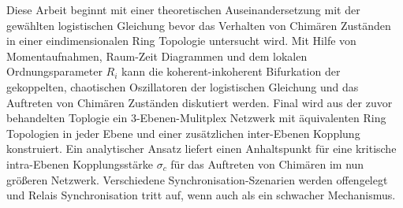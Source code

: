 Diese Arbeit beginnt mit einer theoretischen Auseinandersetzung mit der gewählten logistischen Gleichung bevor das Verhalten von Chimären Zuständen in einer eindimensionalen Ring Topologie untersucht wird. Mit Hilfe von Momentaufnahmen, Raum-Zeit Diagrammen und dem lokalen Ordnungsparameter $R_i$ kann die koherent-inkoherent Bifurkation der gekoppelten, chaotischen Oszillatoren der logistischen Gleichung und das Auftreten von Chimären Zuständen diskutiert werden. Final wird aus der zuvor behandelten Toplogie ein 3-Ebenen-Mulitplex Netzwerk mit äquivalenten Ring Topologien in jeder Ebene und einer zusätzlichen inter-Ebenen Kopplung konstruiert. Ein analytischer Ansatz liefert einen Anhaltspunkt für eine kritische intra-Ebenen Kopplungsstärke $\sigma_c$ für das Auftreten von Chimären im nun größeren Netzwerk. Verschiedene Synchronisation-Szenarien werden offengelegt und Relais Synchronisation tritt auf, wenn auch als ein schwacher Mechanismus.

\newpage\leavevmode\thispagestyle{empty}\newpage

\setcounter{tocdepth}{2}

{\small\tableofcontents}
\thispagestyle{empty}

\newpage\leavevmode\thispagestyle{empty}\newpage

{}\setcounter{page}{1}